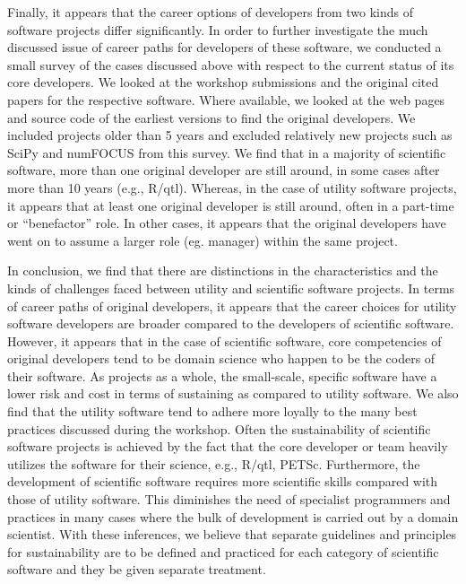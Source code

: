 \documentclass[11pt, oneside]{amsart}
\newcommand{\toolname}[1] {\textsf{#1}}
\begin{document}
Finally, it appears that the career options of developers from
two kinds of software projects differ significantly. In order to
further investigate the much discussed issue of career paths for
developers of these software, we conducted a small survey of the cases
discussed above with respect to the current status of its core developers. We
looked at the workshop submissions and the original cited papers for the
respective software. Where available, we looked at the web pages and source
code of the earliest versions to find the original developers. We included
projects older than 5 years and excluded relatively new projects such as
\toolname{SciPy} and \toolname{numFOCUS} from this survey. We find that in a
majority of scientific software, more than one original developer are still
around, in some cases after more than 10 years (e.g., \toolname{R/qtl}).
Whereas, in the case of utility software projects, it appears that at least one
original developer is still around, often in a part-time or ``benefactor''
role. In other cases, it appears that the original developers have went on to
assume a larger role (eg. manager) within the same project.

In conclusion, we find that there are distinctions in the
characteristics and the kinds of challenges faced between utility and
scientific software projects.  In terms of career paths of original
developers, it appears that the career choices for utility software
developers are broader compared to the developers of scientific
software. However, it appears that in the case of scientific software,
core competencies of original developers tend to be domain science who
happen to be the coders of their software. As projects as a whole, the
small-scale, specific software have a lower risk and cost in terms of
sustaining as compared to utility software. We also find that the
utility software tend to adhere more loyally to the many best
practices discussed during the workshop. Often the sustainability of
scientific software projects is achieved by the fact that the core
developer or team heavily utilizes the software for their science,
e.g., \toolname{R/qtl, PETSc}.  Furthermore, the development of
scientific software requires more scientific skills compared with
those of utility software. This diminishes the need of specialist
programmers and practices in many cases where the bulk of development
is carried out by a domain scientist. With these inferences, we
believe that separate guidelines and principles for sustainability are to
be defined and practiced for each category of scientific software and
they be given separate treatment.
\end{document}
